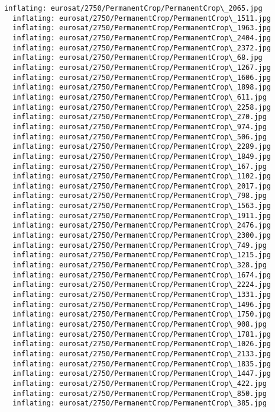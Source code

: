 \documentclass[11pt]{article}
\begin{document}
\begin{Verbatim}[commandchars=\\\{\}]
  inflating: eurosat/2750/PermanentCrop/PermanentCrop\_2065.jpg
  inflating: eurosat/2750/PermanentCrop/PermanentCrop\_1511.jpg
  inflating: eurosat/2750/PermanentCrop/PermanentCrop\_1963.jpg
  inflating: eurosat/2750/PermanentCrop/PermanentCrop\_2404.jpg
  inflating: eurosat/2750/PermanentCrop/PermanentCrop\_2372.jpg
  inflating: eurosat/2750/PermanentCrop/PermanentCrop\_68.jpg
  inflating: eurosat/2750/PermanentCrop/PermanentCrop\_1267.jpg
  inflating: eurosat/2750/PermanentCrop/PermanentCrop\_1606.jpg
  inflating: eurosat/2750/PermanentCrop/PermanentCrop\_1898.jpg
  inflating: eurosat/2750/PermanentCrop/PermanentCrop\_611.jpg
  inflating: eurosat/2750/PermanentCrop/PermanentCrop\_2258.jpg
  inflating: eurosat/2750/PermanentCrop/PermanentCrop\_270.jpg
  inflating: eurosat/2750/PermanentCrop/PermanentCrop\_974.jpg
  inflating: eurosat/2750/PermanentCrop/PermanentCrop\_506.jpg
  inflating: eurosat/2750/PermanentCrop/PermanentCrop\_2289.jpg
  inflating: eurosat/2750/PermanentCrop/PermanentCrop\_1849.jpg
  inflating: eurosat/2750/PermanentCrop/PermanentCrop\_167.jpg
  inflating: eurosat/2750/PermanentCrop/PermanentCrop\_1102.jpg
  inflating: eurosat/2750/PermanentCrop/PermanentCrop\_2017.jpg
  inflating: eurosat/2750/PermanentCrop/PermanentCrop\_798.jpg
  inflating: eurosat/2750/PermanentCrop/PermanentCrop\_1563.jpg
  inflating: eurosat/2750/PermanentCrop/PermanentCrop\_1911.jpg
  inflating: eurosat/2750/PermanentCrop/PermanentCrop\_2476.jpg
  inflating: eurosat/2750/PermanentCrop/PermanentCrop\_2300.jpg
  inflating: eurosat/2750/PermanentCrop/PermanentCrop\_749.jpg
  inflating: eurosat/2750/PermanentCrop/PermanentCrop\_1215.jpg
  inflating: eurosat/2750/PermanentCrop/PermanentCrop\_328.jpg
  inflating: eurosat/2750/PermanentCrop/PermanentCrop\_1674.jpg
  inflating: eurosat/2750/PermanentCrop/PermanentCrop\_2224.jpg
  inflating: eurosat/2750/PermanentCrop/PermanentCrop\_1331.jpg
  inflating: eurosat/2750/PermanentCrop/PermanentCrop\_1496.jpg
  inflating: eurosat/2750/PermanentCrop/PermanentCrop\_1750.jpg
  inflating: eurosat/2750/PermanentCrop/PermanentCrop\_908.jpg
  inflating: eurosat/2750/PermanentCrop/PermanentCrop\_1781.jpg
  inflating: eurosat/2750/PermanentCrop/PermanentCrop\_1026.jpg
  inflating: eurosat/2750/PermanentCrop/PermanentCrop\_2133.jpg
  inflating: eurosat/2750/PermanentCrop/PermanentCrop\_1835.jpg
  inflating: eurosat/2750/PermanentCrop/PermanentCrop\_1447.jpg
  inflating: eurosat/2750/PermanentCrop/PermanentCrop\_422.jpg
  inflating: eurosat/2750/PermanentCrop/PermanentCrop\_850.jpg
  inflating: eurosat/2750/PermanentCrop/PermanentCrop\_385.jpg

\end{Verbatim}
\end{document}
